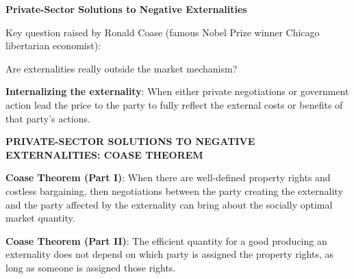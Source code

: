\documentclass[landscape]{slides}
\begin{document}
%
%
%
%


\begin{slide}
\begin{center}
{\bf Private-Sector Solutions to Negative Externalities}
\end{center}

Key question raised by Ronald Coase (famous Nobel Prize winner Chicago libertarian economist):

Are externalities really outside the market mechanism?

{\bf Internalizing the externality}:
When either private negotiations or government action lead the price to the party to fully reflect
the external costs or benefits of that party's actions.
\end{slide}


\begin{slide}
\begin{center}
{\bf PRIVATE-SECTOR SOLUTIONS TO NEGATIVE EXTERNALITIES: COASE THEOREM}
\end{center}

{\bf Coase Theorem (Part \textrm{I})}:
When there are well-defined property rights and costless bargaining, then negotiations between the party creating the externality and the party affected by the externality can bring about the socially optimal market quantity.

{\bf Coase Theorem (Part \textrm{II})}:
The efficient quantity for a good producing an externality does not depend on which party is assigned the property rights, as long as someone is assigned those rights.
\end{slide}
\end{document}
